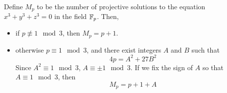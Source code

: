 %

\begin{theorem}
Define $M_p$ to be the number of projective solutions to the equation $x^3 + y^3 + z^3 = 0$ in the field $\mathbb{F}_p$. Then,
\begin{itemize}
\item if $p \not\equiv 1 \mod{3}$, then $M_p = p + 1$.
\item otherwise $p \equiv 1 \mod{3}$, and there exist integers $A$ and $B$ such that
	$$4p = A^2 + 27B^2$$
	Since $A^2 \equiv 1 \mod{3}$, $A \equiv \pm1 \mod{3}$. If we fix the sign of $A$ so that $A \equiv 1 \mod{3}$, then
	$$M_p = p + 1 + A$$
\end{itemize}
\end{theorem}

